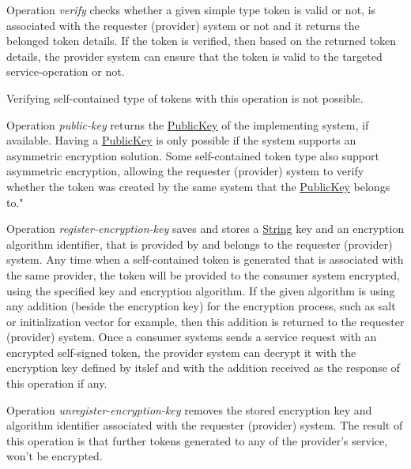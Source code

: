 \documentclass[a4paper]{arrowhead}
\newcommand{\pref}[1]{{\textcolor{ArrowheadGrey}{\hyperref[sec:model:primitives:#1]{#1}}}}
\begin{document}

Operation \textit{verify} checks whether a given simple type token is valid or not, is associated with the requester (provider) system or not and it returns the belonged token details. If the token is verified, then based on the returned token details, the provider system can ensure that the token is valid to the targeted service-operation or not.

Verifying self-contained type of tokens with this operation is not possible.


Operation \textit{public-key} returns the \pref{PublicKey} of the implementing system, if available. Having a \pref{PublicKey} is only possible if the system supports an asymmetric encryption solution. Some self-contained token type also support asymmetric encryption, allowing the requester (provider) system to verify whether the token was created by the same system that the \pref{PublicKey} belongs to." 


Operation \textit{register-encryption-key} saves and stores a \pref{String} key and an encryption algorithm identifier, that is provided by and belongs to the requester (provider) system. Any time when a self-contained token is generated that is associated with the same provider, the token will be provided to the consumer system encrypted, using the specified key and encryption algorithm. If the given algorithm is using any addition (beside the encryption key) for the encryption process, such as salt or initialization vector for example, then this addition is returned to the requester (provider) system. Once a consumer systems sends a service request with an encrypted self-signed token, the provider system can decrypt it with the encryption key defined by itslef and with the addition received as the response of this operation if any.


Operation \textit{unregister-encryption-key} removes the stored encryption key and algorithm identifier associated with the requester (provider) system. The result of this operation is that further tokens generated to any of the provider's service, won't be encrypted. 
\end{document}
